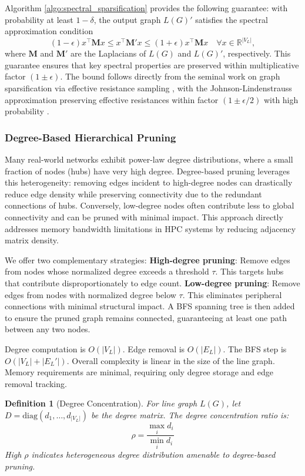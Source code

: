 \documentclass[pdflatex,sn-mathphys-num]{sn-jnl}%
\theoremstyle{thmstyleone}%
\theoremstyle{thmstyletwo}%
\theoremstyle{thmstylethree}%
\newtheorem{definition}{Definition}%
\theoremstyle{plain} %
\theoremstyle{definition} %
\theoremstyle{remark} %
\theoremstyle{plain} %
\begin{document}
Algorithm \ref{algo:spectral_sparsification} provides the following guarantee: with probability at least $1-\delta$, the output graph $L(G)'$ satisfies the spectral approximation condition
\[
(1 - \epsilon) x^\top \mathbf{M} x \leq x^\top \mathbf{M}' x \leq (1 + \epsilon) x^\top \mathbf{M} x \quad \forall x \in \mathbb{R}^{|V_L|},
\]
where $\mathbf{M}$ and $\mathbf{M}'$ are the Laplacians of $L(G)$ and $L(G)'$, respectively. This guarantee ensures that key spectral properties are preserved within multiplicative factor $(1\pm\epsilon)$. The bound follows directly from the seminal work on graph sparsification via effective resistance sampling \cite{spielman2011graph}, with the Johnson-Lindenstrauss approximation preserving effective resistances within factor $(1\pm\epsilon/2)$ with high probability \cite{cohen2015nearly}.


\subsubsection{Degree-Based Hierarchical Pruning}


Many real-world networks exhibit power-law degree distributions, where a small fraction of nodes (hubs) have very high degree. 
Degree-based pruning leverages this heterogeneity: removing edges incident to high-degree nodes can drastically reduce edge density while preserving connectivity due to the redundant connections of hubs. 
Conversely, low-degree nodes often contribute less to global connectivity and can be pruned with minimal impact. 
This approach directly addresses memory bandwidth limitations in HPC systems by reducing adjacency matrix density.

We offer two complementary strategies:  
\textbf{High-degree pruning}: Remove edges from nodes whose normalized degree exceeds a threshold $\tau$. This targets hubs that contribute disproportionately to edge count.  
\textbf{Low-degree pruning}: Remove edges from nodes with normalized degree below $\tau$. This eliminates peripheral connections with minimal structural impact.  
A BFS spanning tree is then added to ensure the pruned graph remains connected, guaranteeing at least one path between any two nodes.


Degree computation is $O(|V_L|)$. Edge removal is $O(|E_L|)$. The BFS step is $O(|V_L| + |E_L'|)$. 
Overall complexity is linear in the size of the line graph. Memory requirements are minimal, requiring only degree storage and edge removal tracking.

\begin{definition}[Degree Concentration]
For line graph $L(G)$, let $D = \text{diag}(d_1, \ldots, d_{|V_L|})$ be the degree matrix. The degree concentration ratio is:
\[
\rho = \frac{\max_i d_i}{\min_i d_i}
\]
High $\rho$ indicates heterogeneous degree distribution amenable to degree-based pruning.
\end{definition}
\end{document}
